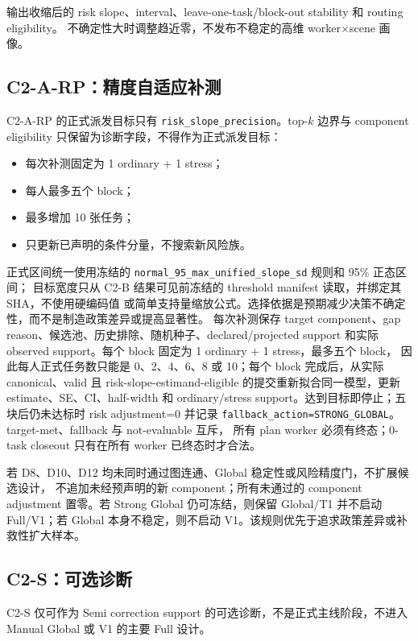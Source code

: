 输出收缩后的 risk slope、interval、leave-one-task/block-out stability 和 routing eligibility。
不确定性大时调整趋近零，不发布不稳定的高维 worker\(\times\)scene 画像。

\subsection{C2-A-RP：精度自适应补测}

C2-A-RP 的正式派发目标只有 \texttt{risk\_slope\_precision}。top-$k$ 边界与 component
eligibility 只保留为诊断字段，不得作为正式派发目标：

\begin{itemize}
  \item 每次补测固定为 1 ordinary + 1 stress；
  \item 每人最多五个 block；
  \item 最多增加 10 张任务；
  \item 只更新已声明的条件分量，不搜索新风险族。
\end{itemize}

正式区间统一使用冻结的 \texttt{normal\_95\_max\_unified\_slope\_sd} 规则和 95\% 正态区间；
目标宽度只从 C2-B 结果可见前冻结的 threshold manifest 读取，并绑定其 SHA，不使用硬编码值
或简单支持量缩放公式。选择依据是预期减少决策不确定性，而不是制造政策差异或提高显著性。
每次补测保存 target component、gap reason、候选池、历史排除、随机种子、declared/projected
support 和实际 observed support。每个 block 固定为 1 ordinary + 1 stress，最多五个 block，
因此每人正式任务数只能是 0、2、4、6、8 或 10；每个 block 完成后，从实际 canonical、valid 且
risk-slope-estimand-eligible 的提交重新拟合同一模型，更新 estimate、SE、CI、half-width 和
ordinary/stress support。达到目标即停止；五块后仍未达标时 risk adjustment=0 并记录
\texttt{fallback\_action=STRONG\_GLOBAL}。target-met、fallback 与 not-evaluable 互斥，
所有 plan worker 必须有终态；0-task closeout 只有在所有 worker 已终态时才合法。

若 D8、D10、D12 均未同时通过图连通、Global 稳定性或风险精度门，不扩展候选设计，
不追加未经预声明的新 component；所有未通过的 component adjustment 置零。若 Strong
Global 仍可冻结，则保留 Global/T1 并不启动 Full/V1；若 Global 本身不稳定，则不启动
V1。该规则优先于追求政策差异或补救性扩大样本。

\subsection{C2-S：可选诊断}

C2-S 仅可作为 Semi correction support 的可选诊断，不是正式主线阶段，不进入 Manual Global
或 V1 的主要 Full 设计。

